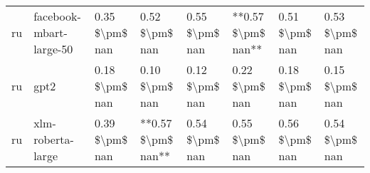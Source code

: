 \begin{tabular}{llllllll}
      ru &            facebook-mbart-large-50 & 0.35 \$\textbackslash pm\$ nan &            0.52 \$\textbackslash pm\$ nan &        0.55 \$\textbackslash pm\$ nan &     **0.57 \$\textbackslash pm\$ nan** &                          0.51 \$\textbackslash pm\$ nan &     0.53 \$\textbackslash pm\$ nan \\
      ru &                               gpt2 & 0.18 \$\textbackslash pm\$ nan &            0.10 \$\textbackslash pm\$ nan &        0.12 \$\textbackslash pm\$ nan &         0.22 \$\textbackslash pm\$ nan &                          0.18 \$\textbackslash pm\$ nan &     0.15 \$\textbackslash pm\$ nan \\
      ru &                  xlm-roberta-large & 0.39 \$\textbackslash pm\$ nan &        **0.57 \$\textbackslash pm\$ nan** &        0.54 \$\textbackslash pm\$ nan &         0.55 \$\textbackslash pm\$ nan &                          0.56 \$\textbackslash pm\$ nan &     0.54 \$\textbackslash pm\$ nan \\
\bottomrule
\end{tabular}
